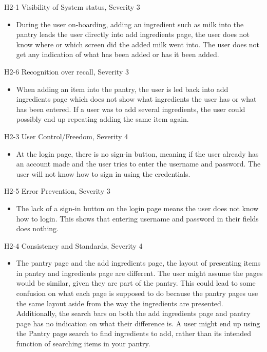 \documentclass[manuscript, screen, nonacm]{acmart}
\begin{document}
H2-1 Visibility of System status, Severity 3
\begin{itemize}
    \item During the user on-boarding, adding an ingredient such as milk into the pantry leads the user directly into add ingredients page, the user does not know where or which screen did the added milk went into.  The user does not get any indication of what has been added or has it been added.
\end{itemize}

H2-6 Recognition over recall, Severity 3
\begin{itemize}
    \item When adding an item into the pantry, the user is led back into add ingredients page which does not show what ingredients the user has or what has been entered. If a user was to  add several ingredients, the user could possibly end up repeating adding the same item again. 
\end{itemize}

H2-3 User Control/Freedom, Severity 4
\begin{itemize}
    \item At the login page, there is no sign-in button, meaning if the user already has an account made and the user tries to enter the username and password. The user will not know how to sign in using the credentials.
\end{itemize}

H2-5 Error Prevention, Severity 3
\begin{itemize}
    \item The lack of a sign-in button on the login page means the user does not know how to login. This shows that entering username and password in their fields does nothing.
\end{itemize}

H2-4 Consistency and Standards, Severity 4
\begin{itemize}
    \item The pantry page and the add ingredients page, the layout of presenting items in pantry and ingredients page are different. The user might assume the pages would be similar, given they are part of the pantry. This could lead to some confusion on what each page is supposed to do because the pantry pages use the same layout aside from the way the ingredients are presented. Additionally, the search bars on both the add ingredients page and pantry page has no indication on what their difference is. A user might end up using the Pantry page search to find ingredients to add, rather than its intended function of searching items in your pantry.
\end{itemize}
\end{document}
